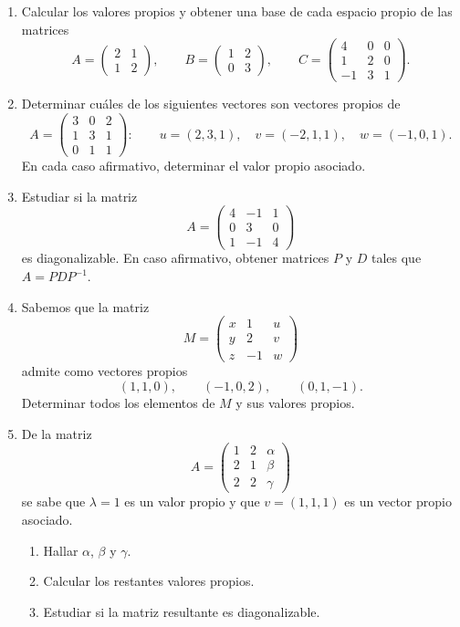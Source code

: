 \begin{enumerate}

\item Calcular los valores propios y obtener una base de cada espacio propio de las matrices
\[
A=\begin{pmatrix}2&1\\1&2\end{pmatrix},
\qquad
B=\begin{pmatrix}1&2\\0&3\end{pmatrix},
\qquad
C=\begin{pmatrix}4&0&0\\1&2&0\\-1&3&1\end{pmatrix}.
\]

\item Determinar cuáles de los siguientes vectores son vectores propios de
\[
A=\begin{pmatrix}
3&0&2\\
1&3&1\\
0&1&1
\end{pmatrix}:
\qquad
u=(2,3,1),\quad v=(-2,1,1),\quad w=(-1,0,1).
\]
En cada caso afirmativo, determinar el valor propio asociado.

\item Estudiar si la matriz
\[
A=\begin{pmatrix}
4&-1&1\\
0&3&0\\
1&-1&4
\end{pmatrix}
\]
es diagonalizable. En caso afirmativo, obtener matrices $P$ y $D$ tales que $A=PDP^{-1}$.

\item Sabemos que la matriz
\[
M=\begin{pmatrix}
x&1&u\\
y&2&v\\
z&-1&w
\end{pmatrix}
\]
admite como vectores propios
\[
(1,1,0),\qquad(-1,0,2),\qquad(0,1,-1).
\]
Determinar todos los elementos de $M$ y sus valores propios.

\item De la matriz
\[
A=\begin{pmatrix}
1&2&\alpha\\
2&1&\beta\\
2&2&\gamma
\end{pmatrix}
\]
se sabe que $\lambda=1$ es un valor propio y que $v=(1,1,1)$ es un vector propio asociado.
\begin{enumerate}[label=\alph*)]
\item Hallar $\alpha$, $\beta$ y $\gamma$.
\item Calcular los restantes valores propios.
\item Estudiar si la matriz resultante es diagonalizable.
\end{enumerate}


\end{enumerate}
